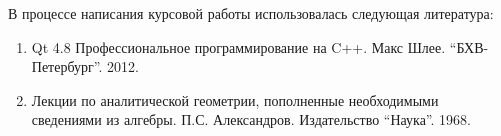 
В процессе написания курсовой работы использовалась следующая литература:

\begin{enumerate}
\item{Qt 4.8 Профессиональное программирование на C++. Макс Шлее. ``БХВ-Петербург''. 2012.}
\item{Лекции по аналитической геометрии, пополненные необходимыми сведениями из алгебры. П.С. Александров. Издательство ``Наука''. 1968.}
\end{enumerate}
